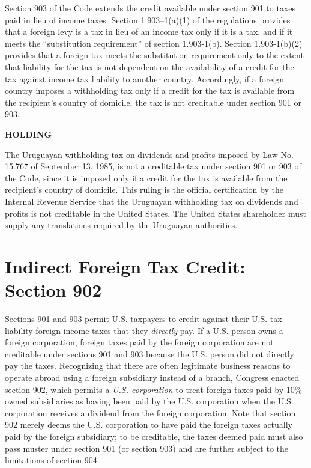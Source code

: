 \begin{select}
Section 903 of the Code extends the credit available under section 901 to taxes paid in lieu of income taxes. Section 
1.903--1(a)(1) of the regulations provides that a foreign levy is a tax in lieu of an income tax only if it is a tax, and if 
it meets the ``substitution requirement'' of section 1.903-1(b). Section 1.903-1(b)(2) provides that a foreign tax meets the 
substitution requirement only to the extent that liability for the tax is not dependent on the availability of a credit for the 
tax against income tax liability to another country. Accordingly, if a foreign country imposes a withholding tax only if a 
credit for the tax is available from the recipient's country of domicile, the tax is not creditable under section 901 or 903. 
\begin{center} \textbf{HOLDING}
\end{center}
The Uruguayan withholding tax on dividends and profits imposed by Law No. 15.767 of September 13, 1985, is not a 
creditable tax under section 901 or 903 of the Code, since it is imposed only if a credit for the tax is available from the
recipient's country of domicile. This ruling is the official certification by the Internal Revenue Service that the Uruguayan 
withholding tax on dividends and profits is not creditable in the United States. The United States shareholder must supply 
any translations required by the Uruguayan authorities.
\end{select}

\section{Indirect Foreign Tax Credit:  Section 902}

Sections 901 and 903 permit U.S. taxpayers to credit against their U.S. tax liability foreign income taxes that they \emph{directly} pay.  If a U.S. person owns a foreign corporation, foreign taxes paid by the foreign corporation are not creditable under sections 901 and 903 because the U.S. person did not directly pay the taxes.  Recognizing that there are often legitimate business reasons to operate abroad using a foreign subsidiary instead of a branch, Congress enacted section 902, which permits a \emph{U.S. corporation} to treat foreign taxes paid by 10\%--owned subsidiaries as having been paid by the U.S. corporation when the U.S. corporation receives a dividend from the foreign corporation.  Note that section 902 merely deems the U.S. corporation to have paid the foreign taxes actually paid by the foreign subsidiary; to be creditable, the taxes deemed paid must also pass muster under section 901 (or section 903) and are further subject to the limitations of section 904.  

